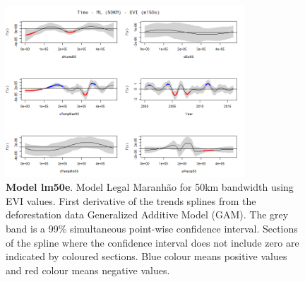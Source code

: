 \begin{table}
\begin{figure}[H]
 \centering
        \centering
        \includegraphics[width=0.8\textwidth]{ml50e.png} %
        \caption[Model Legal Maranhão for 50km bandwidth using EVI values. First derivative of the trends splines from the deforestation data Generalized Additive Model (GAM)]{\textbf{Model lm50e}. Model Legal Maranhão for 50km bandwidth using EVI values. First derivative of the trends splines from the deforestation data Generalized Additive Model (GAM). The grey band is a 99\% simultaneous point-wise confidence interval. Sections of the spline where the confidence interval does not include zero are indicated by coloured sections. Blue colour means positive values and red colour means negative values.}
        \centering
\end{figure}

\end{table}

